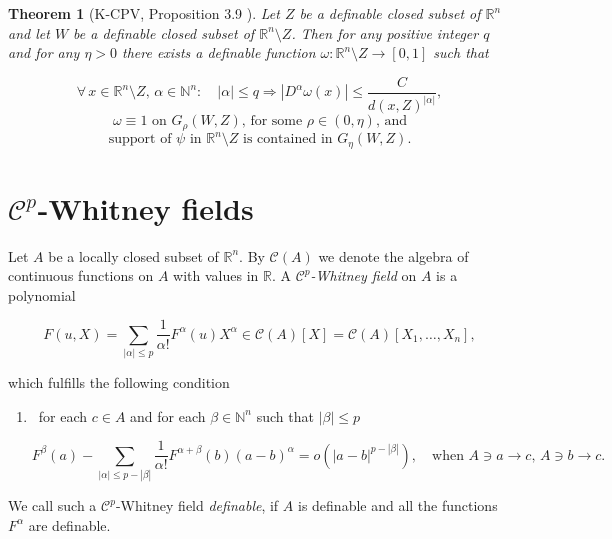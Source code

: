 \documentclass[12pt]{amsart}
\newtheorem{thm}{Theorem}[section]
\theoremstyle{definition}
\theoremstyle{remark}
\numberwithin{equation}{section}
\newcommand{\Real}{\mathbb R}
\begin{document}
\medskip
\begin{thm}[\lbrack K-CPV, Proposition 3.9 \rbrack] Let $Z$ be a definable closed subset of $\Real^n$ and let $W$ be a definable closed subset of $\Real^n\setminus Z$. Then for any positive integer $q$ and for any $\eta > 0$ there exists a definable function  $\omega: \Real^n\setminus Z\longrightarrow [0, 1]$ such that

\begin{equation}
\forall \, x\in \Real^n\setminus Z, \, \alpha\in \mathbb{N}^n: \quad |\alpha|\leq q \Longrightarrow |D^\alpha \omega(x)|\leq \frac{C}{d(x, Z)^{|\alpha|}},
\end{equation}
\begin{equation}
\text{$\omega \equiv 1$ on $G_\rho(W, Z)$, for some $\rho\in (0, \eta)$, and}
\end{equation}
\begin{equation}
\text{support of $\psi$ in $\Real^n\setminus Z$ is contained in $G_\eta(W, Z)$.}
\end{equation}
\end{thm}






\bigskip
\section{$\mathcal{C}^p$-Whitney fields}

\medskip
Let $A$ be a locally closed subset of $\Real^n$. By $\mathcal{C}(A)$ we denote the algebra of continuous functions on $A$ with values in $\Real$. A  \emph{$\mathcal{C}^p$-Whitney field} on $A$ is a polynomial

$$
F(u, X) = \sum_{|\alpha|\leq p}\frac{1}{\alpha!} F^{\alpha}(u)X^{\alpha}\in \mathcal{C}(A)[X] = \mathcal{C}(A)[X_1,\dots,X_n],
$$

which fulfills the following condition

\begin{enumerate}
\item[($\ast$)] {\, for each $c\in A$ and for each $\beta\in \mathbb{N}^n$ such that $|\beta|\leq p$

$$
F^{\beta}(a)- \sum_{|\alpha|\leq p-|\beta|} \frac{1}{\alpha!} F^{\alpha + \beta}(b)(a - b)^{\alpha} = o(|a - b|^{p-|\beta|}), \quad\text{when $A\ni a\rightarrow c$, $A\ni b\rightarrow c$}.
$$}
\end{enumerate}

We call such a $\mathcal{C}^p$-Whitney field \emph{definable}, if $A$ is definable and all the functions $F^{\alpha}$ are definable.
\end{document}
